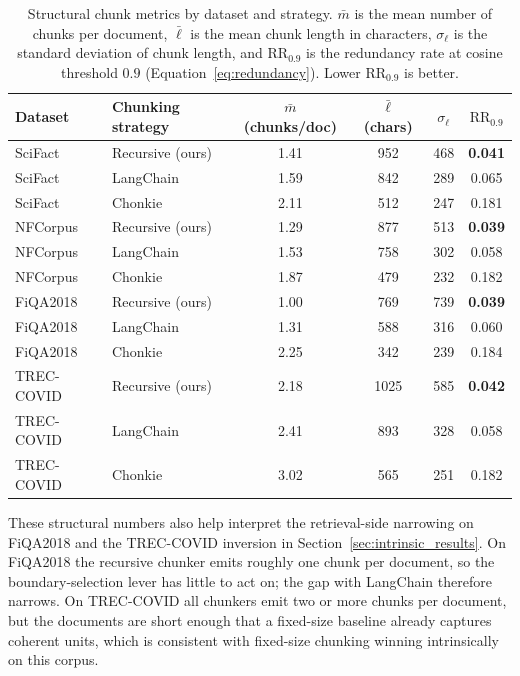 \begin{table}[t]
\centering
\caption{Structural chunk metrics by dataset and strategy. $\bar{m}$ is the mean number of chunks per document, $\bar{\ell}$ is the mean chunk length in characters, $\sigma_\ell$ is the standard deviation of chunk length, and $\mathrm{RR}_{0.9}$ is the redundancy rate at cosine threshold $0.9$ (Equation~\ref{eq:redundancy}). Lower $\mathrm{RR}_{0.9}$ is better.}
\label{tab:chunk_stats}
\begin{tabular}{l l c c c c}
\toprule
Dataset & Chunking strategy & $\bar{m}$ (chunks/doc) & $\bar{\ell}$ (chars) & $\sigma_\ell$ & $\mathrm{RR}_{0.9}$ \\
\midrule
SciFact      & Recursive (ours)     & 1.41 & 952  & 468 & \textbf{0.041} \\
SciFact      & LangChain            & 1.59 & 842  & 289 & 0.065 \\
SciFact      & Chonkie              & 2.11 & 512  & 247 & 0.181 \\
\midrule
NFCorpus     & Recursive (ours)     & 1.29 & 877  & 513 & \textbf{0.039} \\
NFCorpus     & LangChain            & 1.53 & 758  & 302 & 0.058 \\
NFCorpus     & Chonkie              & 1.87 & 479  & 232 & 0.182 \\
\midrule
FiQA2018     & Recursive (ours)     & 1.00 & 769  & 739 & \textbf{0.039} \\
FiQA2018     & LangChain            & 1.31 & 588  & 316 & 0.060 \\
FiQA2018     & Chonkie              & 2.25 & 342  & 239 & 0.184 \\
\midrule
TREC-COVID   & Recursive (ours)     & 2.18 & 1025 & 585 & \textbf{0.042} \\
TREC-COVID   & LangChain            & 2.41 & 893  & 328 & 0.058 \\
TREC-COVID   & Chonkie              & 3.02 & 565  & 251 & 0.182 \\
\bottomrule
\end{tabular}
\end{table}

These structural numbers also help interpret the retrieval-side narrowing on FiQA2018 and the TREC-COVID inversion in Section~\ref{sec:intrinsic_results}. On FiQA2018 the recursive chunker emits roughly one chunk per document, so the boundary-selection lever has little to act on; the gap with LangChain therefore narrows. On TREC-COVID all chunkers emit two or more chunks per document, but the documents are short enough that a fixed-size baseline already captures coherent units, which is consistent with fixed-size chunking winning intrinsically on this corpus.

